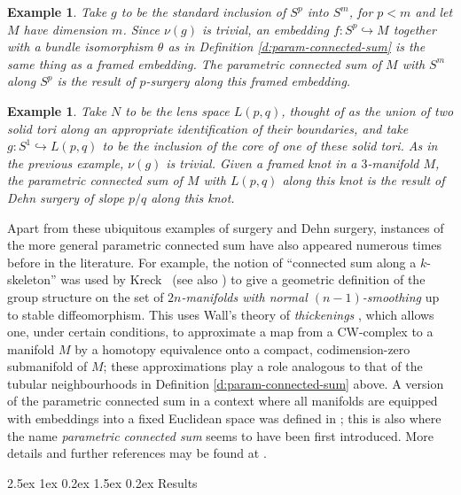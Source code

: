 \documentclass[reqno,a4paper]{article}
\makeatletter
\numberwithin{equation}{section}
\theoremstyle{italicised}
\theoremstyle{upright}
\newtheorem{eg}[thm]{Example}
\theoremstyle{italicised-restate}
\renewcommand*{\subsection}{\@startsection{subsection}{2}{\z@}%
	{2.5ex \@plus 1ex \@minus 0.2ex}%
	{1.5ex \@plus 0.2ex}%
	{\normalfont\normalsize\bfseries}}
\makeatother
\begin{document}
\begin{eg}\label{eg:surgery}
Take $g$ to be the standard inclusion of $S^p$ into $S^m$, for $p<m$ and let $M$ have dimension $m$. Since $\nu(g)$ is trivial, an embedding $f \colon S^p \hookrightarrow M$ together with a bundle isomorphism $\theta$ as in Definition \ref{d:param-connected-sum} is the same thing as a \emph{framed} embedding. The parametric connected sum of $M$ with $S^m$ along $S^p$ is the result of $p$-surgery along this framed embedding.
\end{eg}

\begin{eg}\label{eg:Dehn-surgery}
Take $N$ to be the lens space $L(p,q)$, thought of as the union of two solid tori along an appropriate identification of their boundaries, and take $g \colon S^1 \hookrightarrow L(p,q)$ to be the inclusion of the core of one of these solid tori. As in the previous example, $\nu(g)$ is trivial. Given a framed knot in a $3$-manifold $M$, the parametric connected sum of $M$ with $L(p,q)$ along this knot is the result of Dehn surgery of slope $p/q$ along this knot.
\end{eg}

Apart from these ubiquitous examples of surgery and Dehn surgery, instances of the more general parametric connected sum have also appeared numerous times before in the literature. For example, the notion of ``connected sum along a $k$-skeleton'' was used by Kreck~\cite[pp.\ 25--26]{Kreck1985Surgery} (see also \cite[\S 5 and \S 6]{Kreck2016Classificationofmanifolds}) to give a geometric definition of the group structure on the set of \emph{$2n$-manifolds with normal $(n-1)$-smoothing} up to stable diffeomorphism. This uses Wall's theory of \emph{thickenings} \cite{Wall1966Thickenings}, which allows one, under certain conditions, to approximate a map from a CW-complex to a manifold $M$ by a homotopy equivalence onto a compact, codimension-zero submanifold of $M$; these approximations play a role analogous to that of the tubular neighbourhoods in Definition \ref{d:param-connected-sum} above. A version of the parametric connected sum in a context where all manifolds are equipped with embeddings into a fixed Euclidean space was defined in \cite[page 264]{Skopenkov2007newinvariantparametric}; this is also where the name \emph{parametric connected sum} seems to have been first introduced. More details and further references may be found at \cite{MAP-Parametricconnectedsum}.


\subsection{Results}\label{ss:results}
\end{document}
